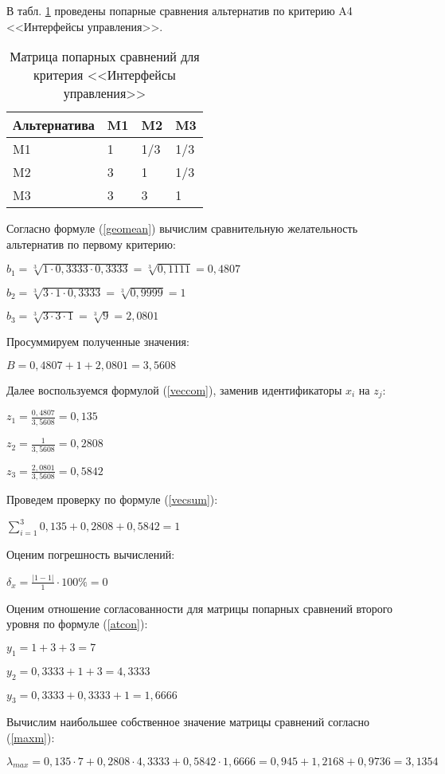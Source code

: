 В табл. \ref{interf} проведены попарные сравнения альтернатив по критерию A4 <<Интерфейсы управления>>.
\begin{table}[H]
  \caption{Матрица попарных сравнений для критерия <<Интерфейсы управления>>}\label{interf}
  \begin{tabular}{|l|l|l|l|}
  \hline Альтернатива & M1 & M2 & M3 \\
  \hline M1 & 1 & 1/3 & 1/3 \\
  \hline M2 & 3 & 1 & 1/3 \\
  \hline M3 & 3 & 3 & 1 \\
  \hline
  \end{tabular}
\end{table}

Согласно формуле (\ref{geomean}) вычислим сравнительную желательность альтернатив по первому критерию:

$b_1 = \sqrt[3]{1 \cdot 0,3333 \cdot 0,3333} = \sqrt[3]{0,1111} = 0,4807$

$b_2 = \sqrt[3]{3 \cdot 1 \cdot 0,3333} = \sqrt[3]{0,9999} = 1$

$b_3 = \sqrt[3]{3 \cdot 3 \cdot 1} = \sqrt[3]{9} = 2,0801$

Просуммируем полученные значения:

$B = 0,4807 + 1 + 2,0801 = 3,5608$

Далее воспользуемся формулой (\ref{veccom}), заменив идентификаторы $x_i$ на $z_j$:

$z_1 = \frac{0,4807}{3,5608} = 0,135$

$z_2 = \frac{1}{3,5608} = 0,2808$

$z_3 = \frac{2,0801}{3,5608} = 0,5842$

Проведем проверку по формуле (\ref{vecsum}):

$\sum_{i=1}^{3} 0,135 + 0,2808 + 0,5842 = 1$

Оценим погрешность вычислений:

$\delta_{x} = \frac{|1 - 1|}{1} \cdot 100\% = 0$

Оценим отношение согласованности для матрицы попарных сравнений второго уровня по формуле (\ref{atcon}):

$y_1 = 1 + 3 + 3 = 7$

$y_2 = 0,3333 + 1 + 3 = 4,3333$

$y_3 = 0,3333 + 0,3333 + 1 = 1,6666$

Вычислим наибольшее собственное значение матрицы сравнений согласно (\ref{maxm}):

$\lambda_{max} = 0,135 \cdot 7 + 0,2808 \cdot 4,3333 + 0,5842 \cdot 1,6666 = 0,945 + 1,2168 + 0,9736 = 3,1354$

